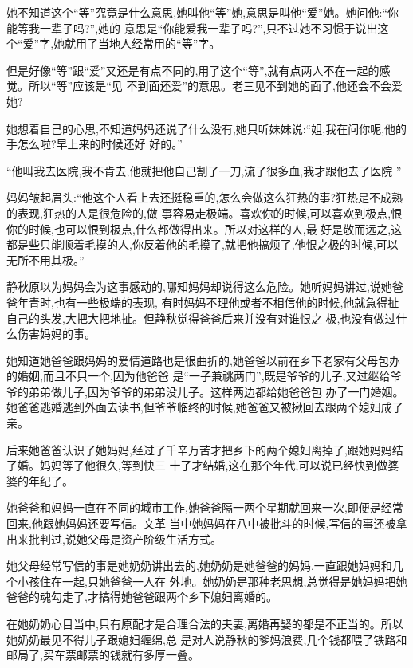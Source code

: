 ﻿\documentclass[12pt]{article}
\begin{document}
她不知道这个``等''究竟是什么意思,她叫他``等''她,意思是叫他``爱''她。她问他:``你能等我一辈子吗?'',她的
意思是``你能爱我一辈子吗?'',只不过她不习惯于说出这个``爱''字,她就用了当地人经常用的``等''字。

但是好像``等''跟``爱''又还是有点不同的,用了这个``等'',就有点两人不在一起的感觉。所以``等''应该是``见
不到面还爱''的意思。老三见不到她的面了,他还会不会爱她?

她想着自己的心思,不知道妈妈还说了什么没有,她只听妹妹说:``姐,我在问你呢,他的手怎么啦?早上来的时候还好
好的。''

``他\myrule 叫我去医院,我不肯去,他就\myrule 把他自己割了一刀\myrule ,流了很多血,我才跟他去了医院
\myrule ''



妈妈皱起眉头:``他这个人看上去还挺稳重的,怎么会做这么狂热的事?狂热是不成熟的表现,狂热的人是很危险的,做
事容易走极端。喜欢你的时候,可以喜欢到极点,恨你的时候,也可以恨到极点,什么都做得出来。所以对这样的人,最
好是敬而远之,这都是些只能顺着毛摸的人,你反着他的毛摸了,就把他搞烦了,他恨之极的时候,可以无所不用其极。''

静秋原以为妈妈会为这事感动的,哪知妈妈却说得这么危险。她听妈妈讲过,说她爸爸年青时,也有一些极端的表现,
有时妈妈不理他或者不相信他的时候,他就急得扯自己的头发,大把大把地扯。但静秋觉得爸爸后来并没有对谁恨之
极,也没有做过什么伤害妈妈的事。

她知道她爸爸跟妈妈的爱情道路也是很曲折的,她爸爸以前在乡下老家有父母包办的婚姻,而且不只一个,因为他爸爸
是``一子兼祧两门'',既是爷爷的儿子,又过继给爷爷的弟弟做儿子,因为爷爷的弟弟没儿子。这样两边都给她爸爸包
办了一门婚姻。她爸爸逃婚逃到外面去读书,但爷爷临终的时候,她爸爸又被揪回去跟两个媳妇成了亲。

后来她爸爸认识了她妈妈,经过了千辛万苦才把乡下的两个媳妇离掉了,跟她妈妈结了婚。妈妈等了他很久,等到快三
十了才结婚,这在那个年代,可以说已经快到做婆婆的年纪了。

她爸爸和妈妈一直在不同的城市工作,她爸爸隔一两个星期就回来一次,即便是经常回来,他跟她妈妈还要写信。文革
当中她妈妈在八中被批斗的时候,写信的事还被拿出来批判过,说她父母是资产阶级生活方式。

她父母经常写信的事是她奶奶讲出去的,她奶奶是她爸爸的妈妈,一直跟她妈妈和几个小孩住在一起,只她爸爸一人在
外地。她奶奶是那种老思想,总觉得是她妈妈把她爸爸的魂勾走了,才搞得她爸爸跟两个乡下媳妇离婚的。

在她奶奶心目当中,只有原配才是合理合法的夫妻,离婚再娶的都是不正当的。所以她奶奶最见不得儿子跟媳妇缠绵,总
是对人说静秋的爹妈浪费,几个钱都喂了铁路和邮局了,买车票邮票的钱就有多厚一叠。
\end{document}
